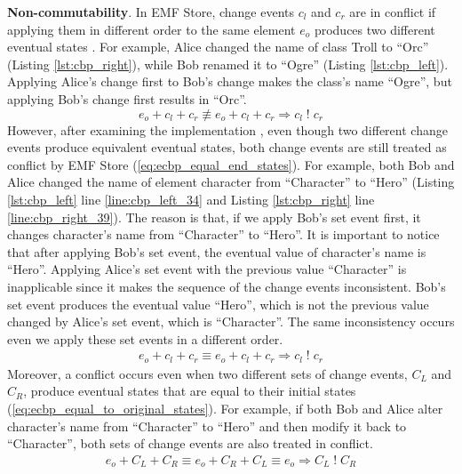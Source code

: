 \textbf{Non-commutability}. In EMF Store, change events $c_{l}$ and $c_{r}$ are in conflict if applying them in different order to the same element $e_{o}$ produces two different eventual states \cite{koegel2010operation}. For example, Alice changed the \textsf{name} of class \textsf{Troll} to “Orc” (Listing \ref{lst:cbp_right}), while Bob renamed it to “Ogre” (Listing \ref{lst:cbp_left}). Applying Alice’s change first to Bob’s change makes the class’s \textsf{name} “Ogre”, but applying Bob’s change first results in “Orc”.
\begin{equation} \label{eq:change_noncommutability}
e_{o} + c_{l} + c_{r} \not\equiv e_{o} + c_{l} + c_{r} \Rightarrow c_{l}\;!\;c_{r}
\end{equation}
However, after examining the implementation \cite{eclipse2019emfstore}, even though two different change events produce equivalent eventual states, both change events are still treated as conflict by EMF Store (\ref{eq:ecbp_equal_end_states}). For example, both Bob and Alice changed the \textsf{name} of element \textsf{character} from “Character” to “Hero” (Listing \ref{lst:cbp_left} line \ref{line:cbp_left_34} and Listing \ref{lst:cbp_right} line \ref{line:cbp_right_39}). The reason is that, if we apply Bob’s set event first, it changes \textsf{character}’s \textsf{name} from “Character” to “Hero”. It is important to notice that after applying Bob’s set event, the eventual value of \textsf{character}’s \textsf{name} is “Hero”. Applying Alice’s set event with the previous value “Character” is inapplicable since it makes the sequence of the change events inconsistent. Bob’s set event produces the eventual value “Hero”, which is not the previous value changed by Alice’s set event, which is “Character”. The same inconsistency occurs even we apply these set events in a different order.
\begin{equation} \label{eq:ecbp_equal_end_states}
\begin{split}
e_{o} + c_{l} + c_{r} \equiv e_{o} + c_{l} + c_{r} \Rightarrow c_{l}\;!\;c_{r}
\end{split}
\end{equation}
Moreover, a conflict occurs even when two different sets of change events, $C_{L}$ and $C_{R}$, produce eventual states that are equal to their initial states (\ref{eq:ecbp_equal_to_original_states}). For example, if both Bob and Alice alter \textsf{character}’s \textsf{name} from “Character” to “Hero” and then modify it back to “Character”, both sets of change events are also treated in conflict.
\begin{equation} \label{eq:ecbp_equal_to_original_states}
\begin{split}
e_{o} + C_{L} + C_{R} \equiv e_{o} + C_{R} + C_{L} \equiv e_{o} \Rightarrow C_{L}\;!\;C_{R}
\end{split}
\end{equation}
